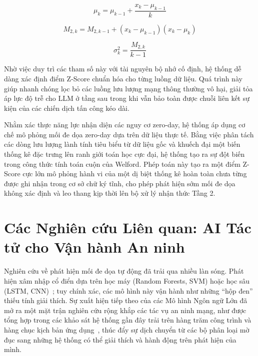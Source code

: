 \begin{equation}
    \label{eq:welford_mean}
    \mu_k = \mu_{k-1} + \frac{x_k - \mu_{k-1}}{k}
\end{equation}

\begin{equation}
    \label{eq:welford_m2}
    M_{2,k} = M_{2,k-1} + (x_k - \mu_{k-1})(x_k - \mu_k)
\end{equation}

\begin{equation}
    \label{eq:welford_var}
    \sigma_k^2 = \frac{M_{2,k}}{k-1}
\end{equation}

Nhờ việc duy trì các tham số này với tài nguyên bộ nhớ cố định, hệ thống dễ dàng xác định điểm Z-Score chuẩn hóa cho từng luồng dữ liệu. Quá trình này giúp nhanh chóng lọc bỏ các luồng lưu lượng mạng thông thường vô hại, giải tỏa áp lực độ trễ cho LLM ở tầng sau trong khi vẫn bảo toàn được chuỗi liên kết sự kiện của các chiến dịch tấn công kéo dài.

Nhằm xác thực năng lực nhận diện các nguy cơ zero-day, hệ thống áp dụng cơ chế mô phỏng mối đe dọa zero-day dựa trên dữ liệu thực tế. Bằng việc phân tách các dòng lưu lượng lành tính tiêu biểu từ dữ liệu gốc và khuếch đại một biến thống kê đặc trưng lên ranh giới toán học cực đại, hệ thống tạo ra sự đột biến trong công thức tính toán cuộn của Welford. Phép toán này tạo ra một điểm Z-Score cực lớn mô phỏng hành vi của một dị biệt thống kê hoàn toàn chưa từng được ghi nhận trong cơ sở chữ ký tĩnh, cho phép phát hiện sớm mối đe dọa không xác định và leo thang kịp thời lên bộ xử lý nhận thức Tầng 2.

\section{Các Nghiên cứu Liên quan: AI Tác tử cho Vận hành An ninh}

Nghiên cứu về phát hiện mối đe dọa tự động đã trải qua nhiều làn sóng. Phát hiện xâm nhập cổ điển dựa trên học máy (Random Forests, SVM) hoặc học sâu (LSTM, CNN)~\cite{mlids2016}; tuy chính xác, các mô hình này vận hành như những ``hộp đen'' thiếu tính giải thích. Sự xuất hiện tiếp theo của các Mô hình Ngôn ngữ Lớn đã mở ra một mặt trận nghiên cứu rộng khắp các tác vụ an ninh mạng, như được tổng hợp trong các khảo sát hệ thống gần đây trải trên hàng trăm công trình và hàng chục kịch bản ứng dụng~\cite{llmsec_survey2025}, thúc đẩy sự dịch chuyển từ các bộ phân loại mờ đục sang những hệ thống có thể giải thích và hành động trên phát hiện của mình.

